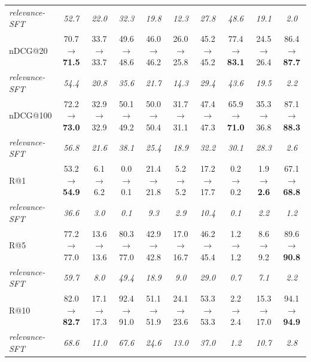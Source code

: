 \begin{table}[H]
{\begin{tabular}{lccccccccc}
\quad \textit{relevance-SFT} & \textit{52.7} & \textit{22.0} & \textit{32.3} & \textit{19.8} & \textit{12.3} & \textit{27.8} & \textit{48.6} & \textit{19.1} & \textit{2.0} \\
nDCG@20 & 70.7 $\rightarrow$ \textbf{71.5} & 33.7 $\rightarrow$ 33.7 & 49.6 $\rightarrow$ 48.6 & 46.0 $\rightarrow$ 46.2 & 26.0 $\rightarrow$ 25.8 & 45.2 $\rightarrow$ 45.2 & 77.4 $\rightarrow$ \textbf{83.1} & 24.5 $\rightarrow$ 26.4 & 86.4 $\rightarrow$ \textbf{87.7} \\
\quad \textit{relevance-SFT} & \textit{54.4} & \textit{20.8} & \textit{35.6} & \textit{21.7} & \textit{14.3} & \textit{29.4} & \textit{43.6} & \textit{19.5} & \textit{2.2} \\
nDCG@100 & 72.2 $\rightarrow$ \textbf{73.0} & 32.9 $\rightarrow$ 32.9 & 50.1 $\rightarrow$ 49.2 & 50.0 $\rightarrow$ 50.4 & 31.7 $\rightarrow$ 31.1 & 47.4 $\rightarrow$ 47.3 & 65.9 $\rightarrow$ \textbf{71.0} & 35.3 $\rightarrow$ 36.8 & 87.1 $\rightarrow$ \textbf{88.3} \\
\quad \textit{relevance-SFT} & \textit{56.8} & \textit{21.6} & \textit{38.1} & \textit{25.4} & \textit{18.9} & \textit{32.2} & \textit{30.1} & \textit{28.3} & \textit{2.6} \\
R@1 & 53.2 $\rightarrow$ \textbf{54.9} & 6.1 $\rightarrow$ 6.2 & 0.0 $\rightarrow$ 0.1 & 21.4 $\rightarrow$ 21.8 & 5.2 $\rightarrow$ 5.2 & 17.2 $\rightarrow$ 17.7 & 0.2 $\rightarrow$ 0.2 & 1.9 $\rightarrow$ \textbf{2.6} & 67.1 $\rightarrow$ \textbf{68.8} \\
\quad \textit{relevance-SFT} & \textit{36.6} & \textit{3.0} & \textit{0.1} & \textit{9.3} & \textit{2.9} & \textit{10.4} & \textit{0.1} & \textit{2.2} & \textit{1.2} \\
R@5 & 77.2 $\rightarrow$ 77.0 & 13.6 $\rightarrow$ 13.6 & 80.3 $\rightarrow$ 77.0 & 42.9 $\rightarrow$ 42.8 & 17.0 $\rightarrow$ 16.7 & 46.2 $\rightarrow$ 45.4 & 1.2 $\rightarrow$ 1.2 & 8.6 $\rightarrow$ 9.2 & 89.6 $\rightarrow$ \textbf{90.8} \\
\quad \textit{relevance-SFT} & \textit{59.7} & \textit{8.0} & \textit{49.4} & \textit{18.9} & \textit{9.0} & \textit{29.0} & \textit{0.7} & \textit{7.1} & \textit{2.2} \\
R@10 & 82.0 $\rightarrow$ \textbf{82.7} & 17.1 $\rightarrow$ 17.3 & 92.4 $\rightarrow$ 91.0 & 51.1 $\rightarrow$ 51.9 & 24.1 $\rightarrow$ 23.6 & 53.3 $\rightarrow$ 53.3 & 2.2 $\rightarrow$ 2.4 & 15.3 $\rightarrow$ 17.0 & 94.1 $\rightarrow$ \textbf{94.9} \\
\quad \textit{relevance-SFT} & \textit{68.6} & \textit{11.0} & \textit{67.6} & \textit{24.6} & \textit{13.0} & \textit{37.0} & \textit{1.2} & \textit{10.7} & \textit{2.8} \\

\end{tabular}}
\end{table}
